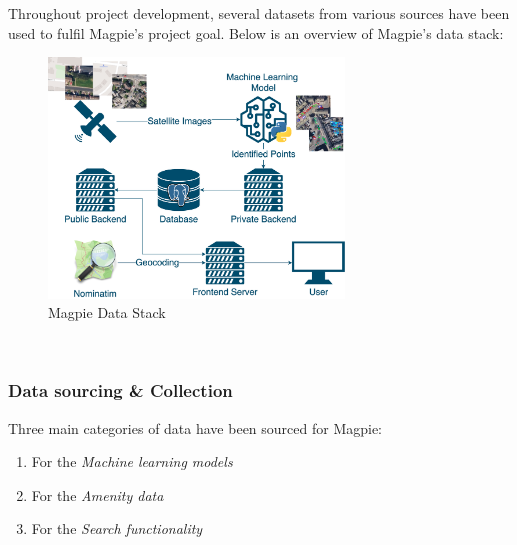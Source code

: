 Throughout project development, several datasets from various sources have been used to fulfil Magpie's project goal. Below is an overview of Magpie's data stack:
\begin{figure}[h!]
    \centering
    \includegraphics[width=0.7\textwidth]{images/magpie-data-stack.png}
    \caption{Magpie Data Stack}
\end{figure}\\

\subsubsection{Data sourcing \& Collection}
Three main categories of data have been sourced for Magpie:
\begin{enumerate}
    \item For the \emph{Machine learning models}
    \item For the \emph{Amenity data}
    \item For the \emph{Search functionality}
\end{enumerate}

